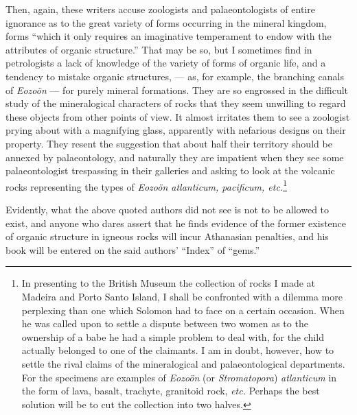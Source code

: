 \documentclass[a4paper, 12pt, oneside]{article}
\begin{document}
Then, again, these writers accuse zoologists and palaeontologists of entire ignorance as to the great variety of forms occurring in the mineral kingdom, forms ``which it only requires an imaginative temperament to endow with the attributes of organic structure.'' That may be so, but I sometimes find in petrologists a lack of knowledge of the variety of forms of organic life, and a tendency to mistake organic structures, --- as, for example, the branching canals of \emph{Eozoön} --- for purely mineral formations. They are so engrossed in the difficult study of the mineralogical characters of rocks that they seem unwilling to regard these objects from other points of view. It almost irritates them to see a zoologist prying about with a magnifying glass, apparently with nefarious designs on their property. They resent the suggestion that about half their territory should be annexed by palaeontology, and naturally they are impatient when they see some palaeontologist trespassing in their galleries and asking to look at the volcanic rocks representing the types of \emph{Eozoön atlanticum, pacificum, etc.}\footnote{In presenting to the British Museum the collection of rocks I made at Madeira and Porto Santo Island, I shall be confronted with a dilemma more perplexing than one which Solomon had to face on a certain occasion. When he was called upon to settle a dispute between two women as to the ownership of a babe he had a simple problem to deal with, for the child actually belonged to one of the claimants. I am in doubt, however, how to settle the rival claims of the mineralogical and palaeontological departments. For the specimens are examples of \emph{Eozoön} (or \emph{Stromatopora}) \emph{atlanticum} in the form of lava, basalt, trachyte, granitoid rock, \emph{etc.} Perhaps the best solution will be to cut the collection into two halves.}

Evidently, what the above quoted authors did not see is not to be allowed to exist, and anyone who dares assert that he finds evidence of the former existence of organic structure in igneous rocks will incur Athanasian penalties, and his book will be entered on the said authors' ``Index'' of ``gems.''
\end{document}
